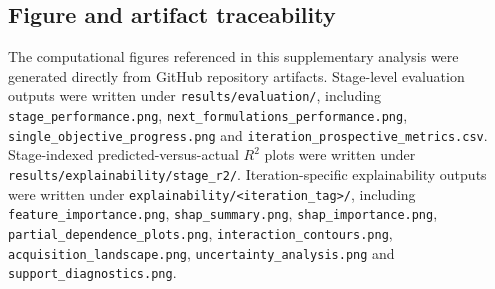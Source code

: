 \documentclass[preprint,12pt]{elsarticle}
\begin{document}
\subsection{Figure and artifact traceability}

The computational figures referenced in this supplementary analysis were generated directly from GitHub repository artifacts. Stage-level evaluation outputs were written under \texttt{results/evaluation/}, including \texttt{stage\_performance.png}, \texttt{next\_formulations\_performance.png}, \texttt{single\_objective\_progress.png} and \texttt{iteration\_prospective\_metrics.csv}. Stage-indexed predicted-versus-actual $R^2$ plots were written under \texttt{results/explainability/stage\_r2/}. Iteration-specific explainability outputs were written under \texttt{explainability/<iteration\_tag>/}, including \texttt{feature\_importance.png}, \texttt{shap\_summary.png}, \texttt{shap\_importance.png}, \newline \texttt{partial\_dependence\_plots.png}, \texttt{interaction\_contours.png}, \texttt{acquisition\_landscape.png}, \texttt{uncertainty\_analysis.png} and \texttt{support\_diagnostics.png}.
\end{document}
